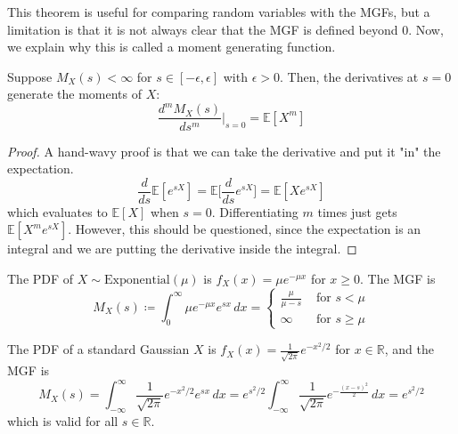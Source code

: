 \documentclass{article}
\begin{document}
      This theorem is useful for comparing random variables with the MGFs, but a limitation is that it is not always clear that the MGF is defined beyond $0$. Now, we explain why this is called a moment generating function. 

      \begin{theorem}
        Suppose $M_X (s) < \infty$ for $s \in [-\epsilon, \epsilon]$ with $\epsilon > 0$. Then, the derivatives at $s = 0$ generate the moments of $X$: 
        \begin{equation}
          \frac{d^m M_X (s)}{d s^m} \bigg|_{s = 0} = \mathbb{E}[X^m]
        \end{equation}
      \end{theorem}
      \begin{proof}
        A hand-wavy proof is that we can take the derivative and put it "in" the expectation. 
        \begin{equation}
          \frac{d}{ds} \mathbb{E}[e^{s X}] = \mathbb{E} \big[ \frac{d}{ds} e^{s X} \big] = \mathbb{E}[X e^{s X}]
        \end{equation}
        which evaluates to $\mathbb{E}[X]$ when $s = 0$. Differentiating $m$ times just gets $\mathbb{E}[X^m e^{s X}]$. However, this should be questioned, since the expectation is an integral and we are putting the derivative inside the integral. 
      \end{proof}

      \begin{example}[Exponential RV]
        The PDF of $X \sim \mathrm{Exponential}(\mu)$ is $f_X (x) = \mu e^{-\mu x}$ for $x \geq 0$. The MGF is 
        \begin{equation}
          M_X (s) \coloneqq \int_0^\infty \mu e^{-\mu x} e^{s x} \, dx = \begin{cases} 
          \frac{\mu}{\mu - s} & \text{ for } s < \mu \\
          \infty & \text{ for } s \geq \mu 
        \end{cases}
        \end{equation}
      \end{example}

      \begin{example}[Gaussian RV]
        The PDF of a standard Gaussian $X$ is $f_X (x) = \frac{1}{\sqrt{2\pi}} e^{-x^2 / 2}$ for $x \in \mathbb{R}$, and the MGF is 
        \begin{equation}
          M_X (s) = \int_{-\infty}^\infty \frac{1}{\sqrt{2 \pi}} e^{- x^2 / 2} e^{s x} \,dx = e^{s^2 / 2} \int_{-\infty}^\infty \frac{1}{\sqrt{2\pi}} e^{-\frac{(x - s)^2}{2}}\,dx = e^{s^2 / 2}
        \end{equation}
        which is valid for all $s \in \mathbb{R}$. 
      \end{example}
\end{document}
